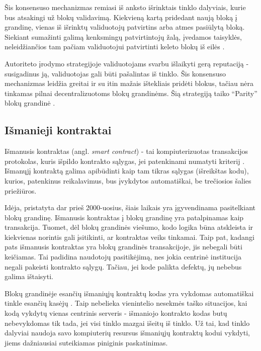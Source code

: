 Šis konsensuso mechanizmas remiasi iš anksto išrinktais tinklo dalyviais, kurie bus atsakingi už blokų validavimą. Kiekvieną kartą pridedant naują
bloką į grandinę, vienas iš išrinktų validuotojų patvirtins arba atmes pasiūlytą bloką. Siekiant sumažinti galimą kenksmingų patvirtintojų žalą,
įvedamos taisyklės, neleidžiančios tam pačiam validuotojui patvirtinti keleto blokų iš eilės \cite{ProofOfAuthority}.

Autoriteto įrodymo strategijoje validuotojams svarbu išlaikyti gerą reputaciją - susigadinus ją, validuotojas gali būti pašalintas iš tinklo. Šis konsensuso mechanizmas
leidžia greitai ir su itin mažais ištekliais pridėti blokus, tačiau nėra tinkamas pilnai decentralizuotoms blokų grandinėms. Šią strategiją
taiko \enquote{Parity} blokų grandinė \cite{ProofOfAuthority}.

\subsection{Išmanieji kontraktai}

Išmanusis kontraktas (angl. \textit{smart contract}) - tai kompiuterizuotas transakcijos protokolas, kuris
išpildo kontrakto sąlygas, jei patenkinami numatyti kriterij \cite{Szabo1997}.
Išmanųjį kontraktą galima apibūdinti kaip tam tikras sąlygas (išreikštas kodu), kurios, patenkinus reikalavimus, bus įvykdytos automatiškai,
be trečiosios šalies priežiūros.

Idėja, pristatyta dar prieš 2000-uosius, šiais laikais yra įgyvendinama pasitelkiant blokų grandinę. Išmanusis kontraktas
į blokų grandinę yra patalpinamas kaip transakcija. Tuomet, dėl blokų grandinės viešumo, kodo logika būna atskleista ir kiekvienas norintis
gali įsitikinti, ar kontraktas veiks tinkamai. Taip pat, kadangi pats išmanusis kontraktas yra blokų grandinės transakcijoje, jis nebegali būti keičiamas.
Tai padidina naudotojų pasitikėjimą, nes jokia centrinė institucija negali
pakeisti kontrakto sąlygų. Tačiau, jei kode palikta defektų, jų nebebus galima ištaisyti.

Blokų grandinėje esančių išmaniųjų kontraktų kodas yra vykdomas automatiškai tinkle esančių kasėjų \cite{Zheng2017}.
Taip nebelieka vienintelio nesekmės taško situacijos, kai kodą vykdytų vienas centrinis serveris - išmaniojo kontrakto
kodas butų nebevykdomas tik tada, jei visi tinklo mazgai išeitų iš tinklo. Už tai, kad tinklo dalyviai naudoja savo kompiuterių
resursus išmaniųjų kontraktų kodui vykdyti, jiems dažniausiai suteikiamas piniginis paskatinimas.

